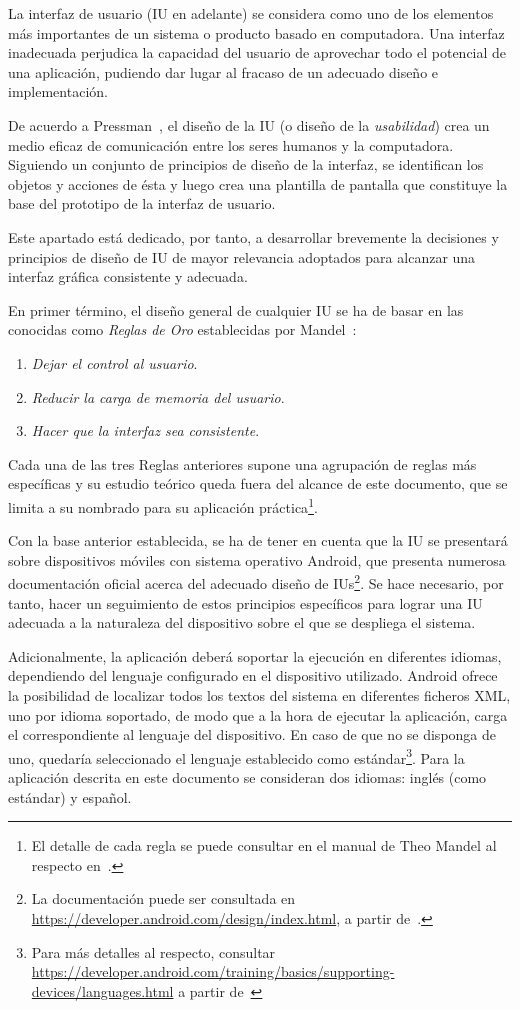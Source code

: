 La interfaz de usuario (IU en adelante) se considera como uno de los elementos más importantes de un sistema o producto basado en computadora. Una interfaz inadecuada perjudica la capacidad del usuario de aprovechar todo el potencial de una aplicación, pudiendo dar lugar al fracaso de un adecuado diseño e implementación.

De acuerdo a Pressman~\cite{Pre10}, el diseño de la IU (o diseño de la \emph{usabilidad}) crea un medio eficaz de comunicación entre los seres humanos y la computadora. Siguiendo un conjunto de principios de diseño de la interfaz, se identifican los objetos y acciones de ésta y luego crea una plantilla de pantalla que constituye la base del prototipo de la interfaz de usuario.

Este apartado está dedicado, por tanto, a desarrollar brevemente la decisiones y principios de diseño de IU de mayor relevancia adoptados para alcanzar una interfaz gráfica consistente y adecuada.

En primer término, el diseño general de cualquier IU se ha de basar en las conocidas como \emph{Reglas de Oro} establecidas por Mandel~\cite{Man97}:

\begin{enumerate}
	\item \textit{Dejar el control al usuario}.
	\item \textit{Reducir la carga de memoria del usuario}.
	\item \textit{Hacer que la interfaz sea consistente}.
\end{enumerate}

Cada una de las tres Reglas anteriores supone una agrupación de reglas más específicas y su estudio teórico queda fuera del alcance de este documento, que se limita a su nombrado para su aplicación práctica\footnote{El detalle de cada regla se puede consultar en el manual de Theo Mandel al respecto en~\cite{Man97}.}.

Con la base anterior establecida, se ha de tener en cuenta que la IU se presentará sobre dispositivos móviles con sistema operativo Android, que presenta numerosa documentación oficial acerca del adecuado diseño de IUs\footnote{La documentación puede ser consultada en \url{https://developer.android.com/design/index.html}, a partir de~\cite{AnDev}.}. Se hace necesario, por tanto, hacer un seguimiento de estos principios específicos para lograr una IU adecuada a la naturaleza del dispositivo sobre el que se despliega el sistema.

Adicionalmente, la aplicación deberá soportar la ejecución en diferentes idiomas, dependiendo del lenguaje configurado en el dispositivo utilizado. Android ofrece la posibilidad de localizar todos los textos del sistema en diferentes ficheros XML, uno por idioma soportado, de modo que a la hora de ejecutar la aplicación, carga el correspondiente al lenguaje del dispositivo. En caso de que no se disponga de uno, quedaría seleccionado el lenguaje establecido como estándar\footnote{Para más detalles al respecto, consultar \url{https://developer.android.com/training/basics/supporting-devices/languages.html} a partir de~\cite{AnDev}}. Para la aplicación descrita en este documento se consideran dos idiomas: inglés (como estándar) y español.

